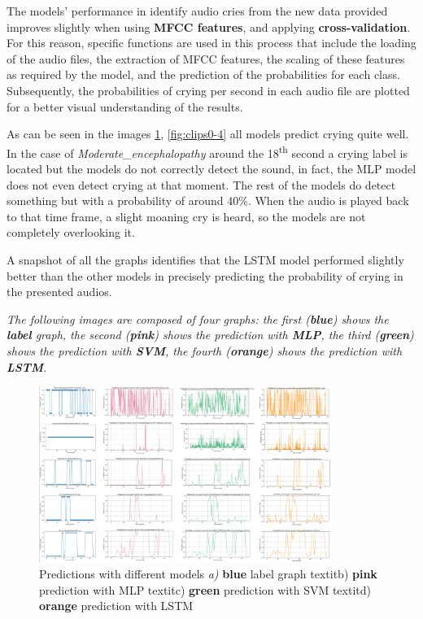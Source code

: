 The models’ performance in identify audio cries from the new data provided improves slightly when using \textbf{MFCC features}, and applying \textbf{cross-validation}. For this reason, specific functions are used in this process that include the loading of the audio files, the extraction of MFCC features, the scaling of these features as required by the model, and the prediction of the probabilities for each class. Subsequently, the probabilities of crying per second in each audio file are plotted for a better visual understanding of the results. 

As can be seen in the images \ref{fig:cualitative-results}, \ref{fig:clips0-4}  all models predict crying quite well. In the case of \textit{Moderate\_encephalopathy} around the 18\textsuperscript{th} second a crying label is located but the models do not correctly detect the sound, in fact, the MLP model does not even detect crying at that moment. The rest of the models do detect something but with a probability of around 40\%. When the audio is played back to that time frame, a slight moaning cry is heard, so the models are not completely overlooking it. 

\begin{tcolorbox}
A snapshot of all the graphs identifies that the LSTM model performed slightly better than the other models in precisely predicting the probability of crying in the presented audios. 
\end{tcolorbox}
\vspace{\baselineskip}
\begin{tcolorbox}
\textit{The following images are composed of four graphs: the first (\textbf{blue}) shows the \textbf{label} graph, the second (\textbf{pink}) shows the prediction with \textbf{MLP}, the third (\textbf{green}) shows the prediction with \textbf{SVM}, the fourth (\textbf{orange}) shows the prediction with \textbf{LSTM}.}
\end{tcolorbox}

\begin{figure}[h]
\centering
    \includegraphics[width=0.85\textwidth]{figures/cualitative-results.png}
\caption{Predictions with different models \textit{a)} \textbf{blue} label graph textit{b)} \textbf{pink} prediction with MLP textit{c)} \textbf{green} prediction with SVM textit{d)} \textbf{orange} prediction with LSTM}
\label{fig:cualitative-results}
\end{figure}

